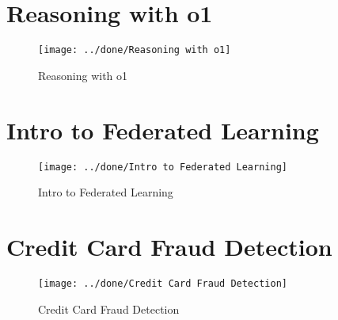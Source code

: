 \documentclass[a4paper,12pt]{article}
\begin{document}
\section*{Reasoning with o1}
\vspace{-5pt} %
\begin{figure}[h]
	\centering
	\vspace{-10pt} %
	\texttt{[image: ../done/Reasoning with o1]}
	\vspace{-5pt} %
	\caption{Reasoning with o1}
	\vspace{-10pt} %
\end{figure}


\section*{Intro to Federated Learning}
\vspace{-5pt} %
\begin{figure}[h]
	\centering
	\vspace{-10pt} %
	\texttt{[image: ../done/Intro to Federated Learning]}
	\vspace{-5pt} %
	\caption{Intro to Federated Learning}
	\vspace{-10pt} %
\end{figure}
\newpage
\section*{Credit Card Fraud Detection}
\vspace{-5pt} %
\begin{figure}[h]
	\centering
	\vspace{-10pt} %
	\texttt{[image: ../done/Credit Card Fraud Detection]}
	\vspace{-5pt} %
	\caption{Credit Card Fraud Detection}
	\vspace{-10pt} %
\end{figure}
\end{document}
